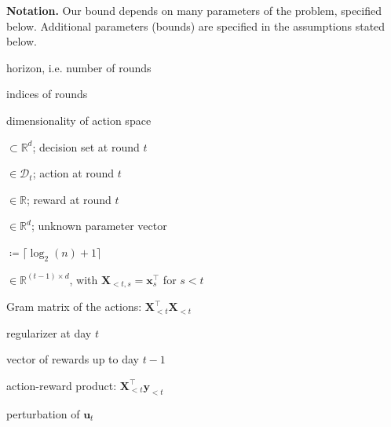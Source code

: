 \documentclass{article}
\renewcommand{\vec}[1]{\bm{#1}}
\newcommand{\defeq}{\coloneq}
\newcommand{\Real}{\mathds{R}}
\newcommand{\D}{\mathcal{D}}
\providecommand\transp{\top}
\let\transpsymbol\transp
\renewcommand{\transp}[1]{#1^\transpsymbol}
\newcommand{\XtX}[1]{\transp{#1}{#1}}
\renewcommand{\paragraph}[1]{\vspace{2pt}\noindent\textbf{#1}}
\begin{document}
\paragraph{Notation.}\label{sec:notation} Our bound depends on many
parameters of the problem, specified below. Additional parameters
(bounds) are specified in the assumptions stated below.
\setlength{\multicolsep}{2.0pt plus 1.0pt minus 1pt}
\begin{multicols}{2}[]
  \nolinenumbers
  \begin{description}[style=sameline,leftmargin=2em,nosep]
  \item[$n$] horizon, i.e. number of rounds
  \item[$s,t$] indices of rounds
  \item[$d$] dimensionality of action space
  \item[$\D_t$] $\subset\Real^d$; decision set at round $t$
  \item[$\vec x_t$] $\in \D_t$; action at round $t$ 
  \item[$y_t$] $\in \Real$; reward at round $t$
  \item[$\vec\theta^*$] $\in \Real^d$; unknown parameter vector
  \item[$m$] $\defeq \lceil\log_2(n)+1 \rceil$
  \item[$\vec X_{<t}$] $\in \Real^{(t-1)\times d}$, with
    $\vec X_{<t,s} = \transp{\vec x_s}$ for $s<t$
  \item[$\vec G_t$] Gram matrix of the actions: $\XtX{\vec X_{<t}}$
  \item[$\vec H_t$] regularizer at day $t$
  \item[$\vec y_{<t}$] vector of rewards up to day $t-1$
  \item[$\vec u_t$] action-reward product: $\transp{\vec X_{<t}} \vec y_{<t}$
  \item[$\vec h_t$] perturbation of $\vec u_t$
  \end{description}
  \linenumbers
\end{multicols}
\vspace{-2mm}
\end{document}
